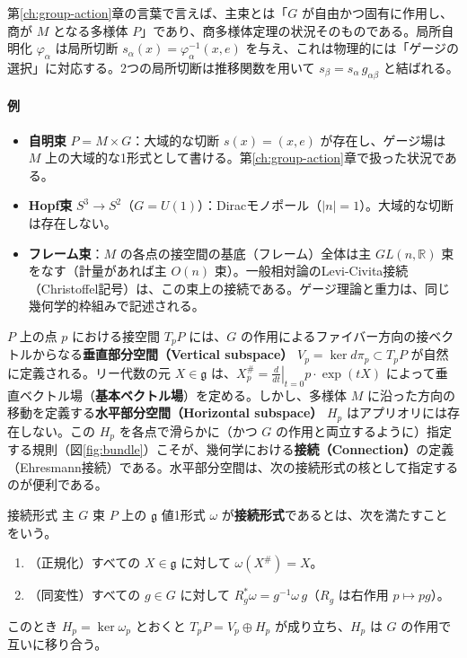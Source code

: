\documentclass[uplatex, dvipdfmx, book]{jsbook}
\begin{document}
第\ref{ch:group-action}章の言葉で言えば、主束とは「$G$ が自由かつ固有に作用し、商が $M$ となる多様体 $P$」であり、商多様体定理の状況そのものである。局所自明化 $\varphi_\alpha$ は局所切断 $s_\alpha(x) = \varphi_\alpha^{-1}(x, e)$ を与え、これは物理的には「ゲージの選択」に対応する。2つの局所切断は推移関数を用いて $s_\beta = s_\alpha\, g_{\alpha\beta}$ と結ばれる。

\paragraph{例}
\begin{itemize}
    \item \textbf{自明束} $P = M \times G$：大域的な切断 $s(x) = (x, e)$ が存在し、ゲージ場は $M$ 上の大域的な1形式として書ける。第\ref{ch:group-action}章で扱った状況である。
    \item \textbf{Hopf束} $S^3 \to S^2$（$G = U(1)$）：Diracモノポール（$|n| = 1$）。大域的な切断は存在しない。
    \item \textbf{フレーム束}：$M$ の各点の接空間の基底（フレーム）全体は主 $GL(n, \mathbb{R})$ 束をなす（計量があれば主 $O(n)$ 束）。一般相対論のLevi-Civita接続（Christoffel記号）は、この束上の接続である。ゲージ理論と重力は、同じ幾何学的枠組みで記述される。
\end{itemize}

$P$ 上の点 $p$ における接空間 $T_p P$ には、$G$ の作用によるファイバー方向の接ベクトルからなる\textbf{垂直部分空間（Vertical subspace）} $V_p = \ker d\pi_p \subset T_p P$ が自然に定義される。リー代数の元 $X \in \mathfrak{g}$ は、$X^\#_p = \left.\frac{d}{dt}\right|_{t=0} p \cdot \exp(tX)$ によって垂直ベクトル場（\textbf{基本ベクトル場}）を定める。しかし、多様体 $M$ に沿った方向の移動を定義する\textbf{水平部分空間（Horizontal subspace）} $H_p$ はアプリオリには存在しない。この $H_p$ を各点で滑らかに（かつ $G$ の作用と両立するように）指定する規則（図\ref{fig:bundle}）こそが、幾何学における\textbf{接続（Connection）}の定義（Ehresmann接続）である。水平部分空間は、次の接続形式の核として指定するのが便利である。

\begin{mydef}{接続形式}{}
主 $G$ 束 $P$ 上の $\mathfrak{g}$ 値1形式 $\omega$ が\textbf{接続形式}であるとは、次を満たすことをいう。
\begin{enumerate}
    \item （正規化）すべての $X \in \mathfrak{g}$ に対して $\omega(X^\#) = X$。
    \item （同変性）すべての $g \in G$ に対して $R_g^* \omega = g^{-1} \omega\, g$（$R_g$ は右作用 $p \mapsto pg$）。
\end{enumerate}
このとき $H_p = \ker \omega_p$ とおくと $T_p P = V_p \oplus H_p$ が成り立ち、$H_p$ は $G$ の作用で互いに移り合う。
\end{mydef}
\end{document}
